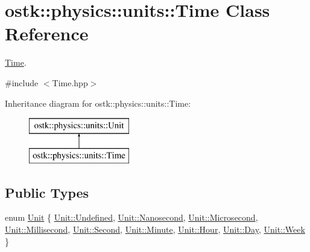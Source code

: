 \hypertarget{classostk_1_1physics_1_1units_1_1_time}{}\section{ostk\+:\+:physics\+:\+:units\+:\+:Time Class Reference}
\label{classostk_1_1physics_1_1units_1_1_time}


\hyperlink{classostk_1_1physics_1_1units_1_1_time}{Time}.  




{\ttfamily \#include $<$Time.\+hpp$>$}

Inheritance diagram for ostk\+:\+:physics\+:\+:units\+:\+:Time\+:\begin{figure}[H]
\begin{center}
\leavevmode
\includegraphics[height=2.000000cm]{classostk_1_1physics_1_1units_1_1_time}
\end{center}
\end{figure}
\subsection*{Public Types}
\begin{DoxyCompactItemize}
\item 
enum \hyperlink{classostk_1_1physics_1_1units_1_1_time_aa961f0dbca7ec297e19e15e0dfa3bb4a}{Unit} \{ \newline
\hyperlink{classostk_1_1physics_1_1units_1_1_time_aa961f0dbca7ec297e19e15e0dfa3bb4aaec0fc0100c4fc1ce4eea230c3dc10360}{Unit\+::\+Undefined}, 
\hyperlink{classostk_1_1physics_1_1units_1_1_time_aa961f0dbca7ec297e19e15e0dfa3bb4aa4146c294bcc82b1723c65bdc64b55089}{Unit\+::\+Nanosecond}, 
\hyperlink{classostk_1_1physics_1_1units_1_1_time_aa961f0dbca7ec297e19e15e0dfa3bb4aa1f14b3811ca5de688daa740d8471249e}{Unit\+::\+Microsecond}, 
\hyperlink{classostk_1_1physics_1_1units_1_1_time_aa961f0dbca7ec297e19e15e0dfa3bb4aa988bbeeb80e7e0a6b4651aab5a76b413}{Unit\+::\+Millisecond}, 
\newline
\hyperlink{classostk_1_1physics_1_1units_1_1_time_aa961f0dbca7ec297e19e15e0dfa3bb4aac22cf8376b1893dcfcef0649fe1a7d87}{Unit\+::\+Second}, 
\hyperlink{classostk_1_1physics_1_1units_1_1_time_aa961f0dbca7ec297e19e15e0dfa3bb4aa62902641c38f3a4a8eb3212454360e24}{Unit\+::\+Minute}, 
\hyperlink{classostk_1_1physics_1_1units_1_1_time_aa961f0dbca7ec297e19e15e0dfa3bb4aab55e509c697e4cca0e1d160a7806698f}{Unit\+::\+Hour}, 
\hyperlink{classostk_1_1physics_1_1units_1_1_time_aa961f0dbca7ec297e19e15e0dfa3bb4aa03727ac48595a24daed975559c944a44}{Unit\+::\+Day}, 
\newline
\hyperlink{classostk_1_1physics_1_1units_1_1_time_aa961f0dbca7ec297e19e15e0dfa3bb4aad2ce009594dcc60befa6a4e6cbeb71fc}{Unit\+::\+Week}
 \}
\end{DoxyCompactItemize}
